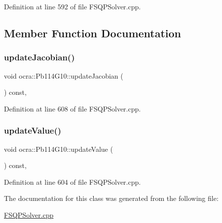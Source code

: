 Definition at line 592 of file F\+S\+Q\+P\+Solver.\+cpp.



\subsection{Member Function Documentation}
\hypertarget{classocra_1_1Pb114G10_aab79b71d5356edb0cd551158bb9bb93b}{}\label{classocra_1_1Pb114G10_aab79b71d5356edb0cd551158bb9bb93b} 
\subsubsection{\texorpdfstring{update\+Jacobian()}{updateJacobian()}}
{\footnotesize\ttfamily void ocra\+::\+Pb114\+G10\+::update\+Jacobian (\begin{DoxyParamCaption}{ }\end{DoxyParamCaption}) const\hspace{0.3cm}{\ttfamily [inline]}, {\ttfamily [protected]}}



Definition at line 608 of file F\+S\+Q\+P\+Solver.\+cpp.

\hypertarget{classocra_1_1Pb114G10_a8bdb81b11c37543a833cd09b199d9a1c}{}\label{classocra_1_1Pb114G10_a8bdb81b11c37543a833cd09b199d9a1c} 
\subsubsection{\texorpdfstring{update\+Value()}{updateValue()}}
{\footnotesize\ttfamily void ocra\+::\+Pb114\+G10\+::update\+Value (\begin{DoxyParamCaption}{ }\end{DoxyParamCaption}) const\hspace{0.3cm}{\ttfamily [inline]}, {\ttfamily [protected]}}



Definition at line 604 of file F\+S\+Q\+P\+Solver.\+cpp.



The documentation for this class was generated from the following file\+:\begin{DoxyCompactItemize}
\item 
\hyperlink{FSQPSolver_8cpp}{F\+S\+Q\+P\+Solver.\+cpp}\end{DoxyCompactItemize}
